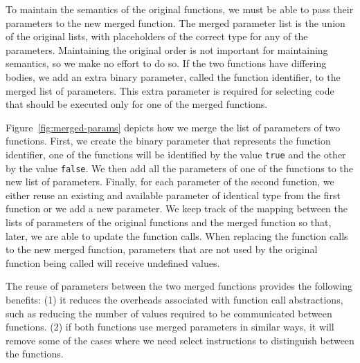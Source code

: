 
To maintain the semantics of the original functions, we must be able to pass their parameters to
the new merged function. The merged parameter list is the union of the original lists, with
placeholders of the correct type for any of the parameters. Maintaining the original order is not
important for maintaining semantics, so we make no effort to do so.
If the two functions have differing bodies, we add an extra binary parameter, called the function
identifier, to the merged list of parameters. This extra parameter is required for selecting code
that should be executed only for one of the merged functions.

Figure~\ref{fig:merged-params} depicts
how we merge the list of parameters of two functions.
First, we create the binary parameter that represents the function identifier,
one of the functions will be identified by the value \texttt{true} and the other
by the value \texttt{false}.
We then add all the parameters of one of the functions to the new list of
parameters.
Finally, for each parameter of the second function, we either reuse an existing
and available parameter of identical type from the first function or we add a
new parameter.
We keep track of the mapping between the lists of parameters of the
original functions and the merged function so that, later, we are able to
update the function calls.
When replacing the function calls to the new merged function, parameters that
are not used by the original function being called will receive undefined values.

The reuse of parameters between the two merged functions provides the following
benefits:
(1) it reduces the overheads associated with function call abstractions, such as
reducing the number of values required to be communicated between functions.
(2) if both functions use merged parameters in similar ways, it will remove some
of the cases where we need select instructions to distinguish between the functions.

